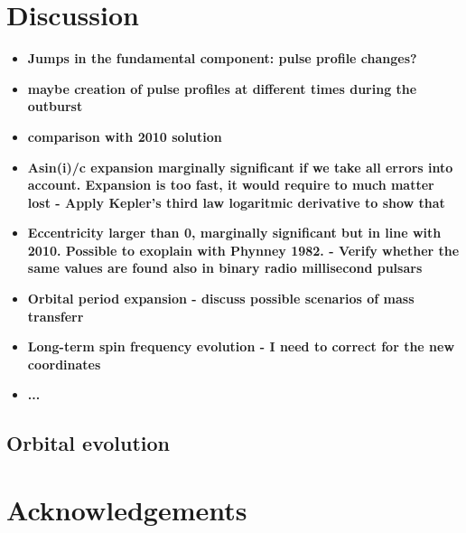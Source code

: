\documentclass[fleqn,usenatbib]{mnras}
\newcommand{\swiftj}{SWIFT J1749.4-2807}
\newcommand{\nicer}{NICER}
\newcommand{\xmm}{XMM-Newton}
\begin{document}
\section{Discussion}

\begin{itemize}
We have reported an updated timing solution for the perculiar accreting millisecond X-ray pulsar \swiftj{} obtained by performing phase-coherent timing analysis of the X-ray pulsations detected by \nicer{} and \xmm{} during the latest outburst of the source. Interestingly, the new set of orbital parameters show significant signs of temporal evolution with respect to the timing solution obtained from the first outburst \citep{Markwardt:2010tl}, which likely suggests conspicuous mass-loss from the companion star. Moreover, we find evidence of low eccentricy 
	
\item \textbf{Jumps in the fundamental component: pulse profile changes?}
\item \textbf{maybe creation of pulse profiles at different times during the outburst}





\item \textbf{comparison with 2010 solution}
\item \textbf{Asin(i)/c expansion marginally significant if we take all errors into account. Expansion is too fast, it would require to much matter lost - Apply Kepler's third law logaritmic derivative to show that}
\item \textbf{Eccentricity larger than 0, marginally significant but in line with 2010. Possible to exoplain with Phynney 1982. - Verify whether the same values are found also in binary radio millisecond pulsars}
\item \textbf{Orbital period expansion - discuss possible scenarios of mass transferr}
\item \textbf{Long-term spin frequency evolution - I need to correct for the new coordinates}
\item \textbf{...}
\end{itemize}

\subsection{Orbital evolution}

\section*{Acknowledgements}
\end{document}
